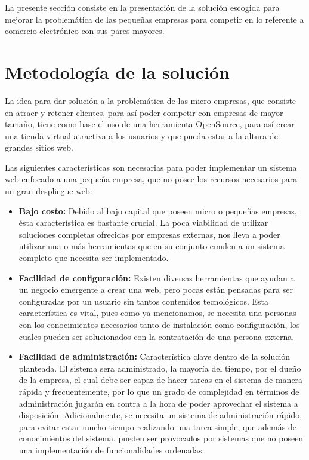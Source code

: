La presente sección consiste en la presentación de la solución escogida
para mejorar la problemática de las pequeñas empresas para competir en lo
referente a comercio electrónico con sus pares mayores.

\section{Metodología de la solución}
\label{sec:4.1}

La idea para dar solución a la problemática de las micro empresas,
que consiste en atraer y retener clientes, para así poder competir
con empresas de mayor tamaño, tiene como base el uso de una herramienta
OpenSource, para así crear una tienda virtual atractiva a los usuarios
y que pueda estar a la altura de grandes sitios web.

Las siguientes características son necesarias para poder implementar un sistema
web enfocado a una pequeña empresa, que no posee los recursos necesarios
para un gran despliegue web:

\begin{itemize}
    \item {\bf Bajo costo:}
        Debido al bajo capital que poseen micro o pequeñas empresas,
        ésta característica es bastante crucial.
        La poca viabilidad de utilizar soluciones completas ofrecidas
        por empresas externas, nos lleva a poder utilizar una o más herramientas
        que en su conjunto emulen a un sistema completo que necesita ser
        implementado.

    \item {\bf Facilidad de configuración:}
        Existen diversas herramientas que ayudan a un negocio emergente a crear
        una web, pero pocas están pensadas para ser configuradas por un usuario
        sin tantos contenidos tecnológicos.
        Esta característica es vital, pues como ya mencionamos,
        se necesita una personas con los conocimientos necesarios tanto
        de instalación como configuración, los cuales pueden ser solucionados
        con la contratación de una persona externa.

    \item {\bf Facilidad de administración:}
        Característica clave dentro de la solución planteada.
        El sistema sera administrado, la mayoría del tiempo, por el dueño de la
        empresa, el cual debe ser capaz de hacer tareas en el sistema
        de manera rápida y frecuentemente, por lo que un grado
        de complejidad en términos de administración jugarán en contra
        a la hora de poder aprovechar el sistema a disposición.
        Adicionalmente, se necesita un sistema de administración rápido,
        para evitar estar mucho tiempo realizando una tarea simple, que
        además de conocimientos del sistema, pueden ser provocados por sistemas
        que no poseen una implementación de funcionalidades ordenadas.

\end{itemize}

